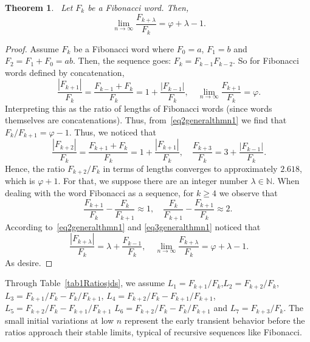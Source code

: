 \documentclass[11pt, a4paper]{article}
\newtheorem{theorem}{Theorem}[section]
\theoremstyle{definition}
\begin{document}
\begin{theorem}~\label{generalthmn1}
Let $F_k$ be a Fibonacci word. Then, 
\begin{equation}~\label{eq1generalthmn1}
\lim_{n\to \infty}\frac{F_{k+\lambda}}{F_{k}}=\varphi+\lambda-1.
\end{equation}
\end{theorem}
\begin{proof}
Assume $F_k$ be a Fibonacci word where $F_0=a$, $F_1=b$ and $F_2=F_1+F_0=ab$. Then, the sequence goes: $F_k=F_{k-1}F_{k-2}$. So for Fibonacci words defined by concatenation, 
\begin{equation}~\label{eq2generalthmn1}
\frac{|F_{k+1}|}{F_k}=\frac{F_{k-1}+F_k}{F_k}=1+\frac{|F_{k-1}|}{F_k}, \quad \lim_{n\to \infty}\frac{F_{k+1}}{F_k}=\varphi.
\end{equation}
Interpreting this as the ratio of lengths of Fibonacci words (since words themselves are concatenations). Thus, from~\eqref{eq2generalthmn1} we find that $F_k/F_{k+1}=\varphi-1$. Thus, we noticed that 
\begin{equation}~\label{eq3generalthmn1}
\frac{|F_{k+2}|}{F_k}=\frac{F_{k+1}+F_{k}}{F_k}=1+\frac{|F_{k+1}|}{F_k} ,\quad \frac{F_{k+3}}{F_k}=3+\frac{|F_{k-1}|}{F_k}.
\end{equation}
Hence, the ratio $F_{k+2}/F_k$ in terms of lengths converges to approximately $2.618$, which is $\varphi+1$. For that, we suppose there are an integer number $\lambda\in \mathbb{N}$. When dealing with the word Fibonacci as a sequence, for $k\geqslant 4$ we observe that
\[
\frac{F_{k+1}}{F_k}-\frac{F_k}{F_{k+1}}\approx 1, \quad \frac{F_k}{F_{k+1}}-\frac{F_{k+1}}{F_k} \approx 2.
\]
According to~\eqref{eq2generalthmn1} and \eqref{eq3generalthmn1} noticed that 
\begin{equation}~\label{eq4generalthmn1}
 \frac{|F_{k+\lambda}|}{F_k}=\lambda+\frac{F_{k-1}}{F_k}, \quad \lim_{n\to \infty}\frac{F_{k+\lambda}}{F_{k}}=\varphi+\lambda-1.
\end{equation}
As desire.
\end{proof}
Through Table~\ref{tab1Ratiosjds}, we assume $L_1=F_{k+1}/F_k$,$L_2=F_{k+2}/F_k$, $L_3=F_{k+1}/F_k-F_k/F_{k+1}$, $L_4=F_{k+2}/F_k-F_{k+1}/F_{k+1}$, $L_5=F_{k+2}/F_k-F_{k+1}/F_{k+1}$ $L_6=F_{k+2}/F_k-F_k/F_{k+1}$ and $L_7=F_{k+3}/F_k$. The small initial variations at low $n$ represent the early transient behavior before the ratios approach their stable limits, typical of recursive sequences like Fibonacci.
\end{document}
